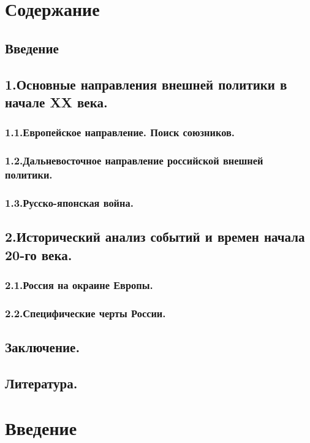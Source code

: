 \documentclass[12pt]{article}
\begin{document}
\section* {Содержание}

\subsection* {Введение}

\subsection* {1.Основные направления внешней политики в начале XX века.}
\subsubsection* {1.1.Европейское направление. Поиск союзников.}
\subsubsection* {1.2.Дальневосточное направление российской внешней политики.}
\subsubsection* {1.3.Русско-японская война.}

\subsection* {2.Исторический анализ событий и времен начала 20-го века.}
\subsubsection* {2.1.Россия на окраине Европы.}
\subsubsection* {2.2.Специфические черты России.}

\subsection* {Заключение.}

\subsection* {Литература.}
\newpage
\pagestyle{plain}
\setcounter{page}{1}
\section* {Введение}
\end{document}
